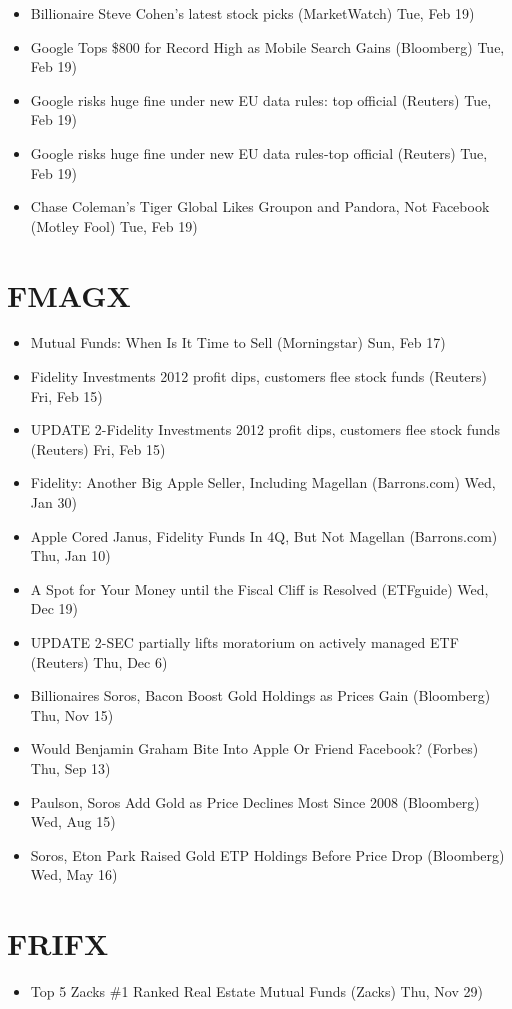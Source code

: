 \documentclass[11pt,asymmetric]{article}
\begin{document}
\begin{itemize}
\item Billionaire Steve Cohen's latest stock picks (MarketWatch) Tue, Feb 19)
\item Google Tops \$800 for Record High as Mobile Search Gains (Bloomberg) Tue, Feb 19)
\item Google risks huge fine under new EU data rules: top official (Reuters) Tue, Feb 19)
\item Google risks huge fine under new EU data rules-top official (Reuters) Tue, Feb 19)
\item Chase Coleman’s Tiger Global Likes Groupon and Pandora, Not Facebook (Motley Fool) Tue, Feb 19)
\end{itemize}

\section*{FMAGX}
\begin{itemize}
\item Mutual Funds: When Is It Time to Sell (Morningstar) Sun, Feb 17)
\item Fidelity Investments 2012 profit dips, customers flee stock funds (Reuters) Fri, Feb 15)
\item UPDATE 2-Fidelity Investments 2012 profit dips, customers flee stock funds (Reuters) Fri, Feb 15)
\item Fidelity: Another Big Apple Seller, Including Magellan (Barrons.com) Wed, Jan 30)
\item Apple Cored Janus, Fidelity Funds In 4Q, But Not Magellan (Barrons.com) Thu, Jan 10)
\item A Spot for Your Money until the Fiscal Cliff is Resolved (ETFguide) Wed, Dec 19)
\item UPDATE 2-SEC partially lifts moratorium on actively managed ETF (Reuters) Thu, Dec 6)
\item Billionaires Soros, Bacon Boost Gold Holdings as Prices Gain (Bloomberg) Thu, Nov 15)
\item Would Benjamin Graham Bite Into Apple Or Friend Facebook? (Forbes) Thu, Sep 13)
\item Paulson, Soros Add Gold as Price Declines Most Since 2008 (Bloomberg) Wed, Aug 15)
\item Soros, Eton Park Raised Gold ETP Holdings Before Price Drop (Bloomberg) Wed, May 16)
\end{itemize}

\section*{FRIFX}
\begin{itemize}
\item Top 5 Zacks \#1 Ranked Real Estate Mutual Funds (Zacks) Thu, Nov 29)
\end{itemize}
\end{document}
